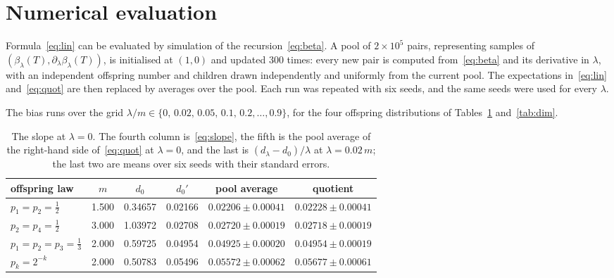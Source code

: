 \documentclass[11pt]{amsart}
\theoremstyle{definition}
\begin{document}
\section{Numerical evaluation}\label{sec:numerics}

Formula~\eqref{eq:lin} can be evaluated by simulation of the recursion~\eqref{eq:beta}. A pool of $2\times10^5$
pairs, representing samples of $(\beta_\lambda(T),\partial_\lambda\beta_\lambda(T))$, is initialised at $(1,0)$
and updated $300$ times: every new pair is computed from~\eqref{eq:beta} and its derivative in $\lambda$, with an
independent offspring number and children drawn independently and uniformly from the current pool. The
expectations in~\eqref{eq:lin} and~\eqref{eq:quot} are then replaced by averages over the pool. Each run was
repeated with six seeds, and the same seeds were used for every $\lambda$.

The bias runs over the grid $\lambda/m\in\{0,\,0.02,\,0.05,\,0.1,\,0.2,\dots,0.9\}$, for the four offspring
distributions of Tables~\ref{tab:slope} and~\ref{tab:dim}.

\begin{table}[ht]\centering\small
\begin{tabular}{lccccc}\toprule
offspring law & $m$ & $d_0$ & $d_0'$ & pool average & quotient \\ \midrule
$p_1=p_2=\tfrac12$ & 1.500 & 0.34657 & 0.02166 & $0.02206\pm0.00041$ & $0.02228\pm0.00041$ \\
$p_2=p_4=\tfrac12$ & 3.000 & 1.03972 & 0.02708 & $0.02720\pm0.00019$ & $0.02718\pm0.00019$ \\
$p_1=p_2=p_3=\tfrac13$ & 2.000 & 0.59725 & 0.04954 & $0.04925\pm0.00020$ & $0.04954\pm0.00019$ \\
$p_k=2^{-k}$ & 2.000 & 0.50783 & 0.05496 & $0.05572\pm0.00062$ & $0.05677\pm0.00061$ \\
\bottomrule\end{tabular}
\caption{The slope at $\lambda=0$. The fourth column is~\eqref{eq:slope}, the fifth is the pool average of the
right-hand side of~\eqref{eq:quot} at $\lambda=0$, and the last is $(d_{\lambda}-d_0)/\lambda$ at
$\lambda=0.02\,m$; the last two are means over six seeds with their standard errors.}\label{tab:slope}
\end{table}
\end{document}
